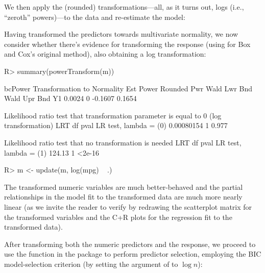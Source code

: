 \documentclass[
]{jss}
\begin{document}
We then apply the (rounded) transformations---all, as it turns out, logs
(i.e., ``zeroth'' powers)---to the data and re-estimate the model:

\begin{CodeChunk}
\end{CodeChunk}

Having transformed the predictors towards multivariate normality, we now
consider whether there's evidence for transforming the response (using
 for Box and Cox's original method), also
obtaining a log transformation:

\begin{CodeChunk}
\begin{CodeInput}
R> summary(powerTransform(m))
\end{CodeInput}
\begin{CodeOutput}
bcPower Transformation to Normality
   Est Power Rounded Pwr Wald Lwr Bnd Wald Upr Bnd
Y1    0.0024           0      -0.1607       0.1654

Likelihood ratio test that transformation parameter is equal to 0
 (log transformation)
                             LRT df  pval
LR test, lambda = (0) 0.00080154  1 0.977

Likelihood ratio test that no transformation is needed
                         LRT df   pval
LR test, lambda = (1) 124.13  1 <2e-16
\end{CodeOutput}
\begin{CodeInput}
R> m <- update(m, log(mpg) ~ .)
\end{CodeInput}
\end{CodeChunk}

The transformed numeric variables are much better-behaved and the
partial relationships in the model fit to the transformed data are much
more nearly linear (as we invite the reader to verify by redrawing the
scatterplot matrix for the transformed variables and the C+R plots for
the regression fit to the transformed data).

After transforming both the numeric predictors and the response, we
proceed to use the  function in the  package
to perform predictor selection, employing the BIC model-selection
criterion (by setting the  argument of  to
\(\log n\)):
\end{document}
